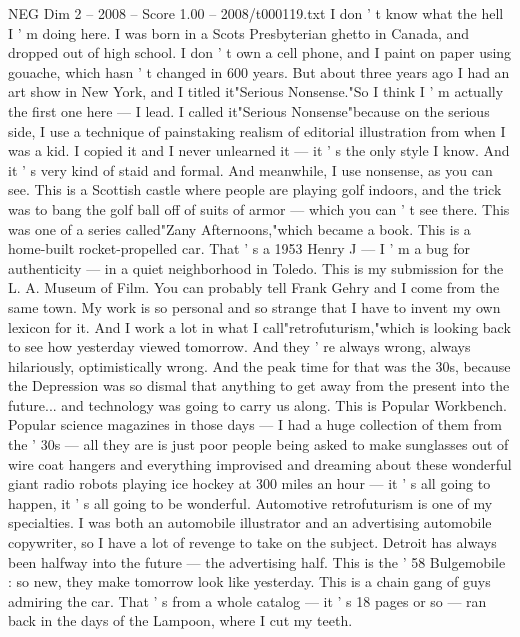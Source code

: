 \begin{textsample}{NEG Dim 2 – 2008 – Score 1.00 – 2008/t000119.txt}  \label{ex:f2_neg_024}
I don ' t know what the hell I ' m doing here.
I was born in a Scots Presbyterian ghetto in Canada, and dropped out of high school.
I don ' t own a cell phone, and I paint on paper using gouache, which hasn ' t changed in 600 years.
But about three years ago I had an art show in New York, and I titled it"Serious Nonsense."So I think I ' m actually the first one here — I lead.
I called it"Serious Nonsense"because on the serious side, I use a technique of painstaking realism of editorial illustration from when I was a kid.
I copied it and I never unlearned it — it ' s the only style I know.
And it ' s very kind of staid and formal.
And meanwhile, I use nonsense, as you can see.
This is a Scottish castle where people are playing golf indoors, and the trick was to bang the golf ball off of suits of armor — which you can ' t see there.
This was one of a series called"Zany Afternoons,"which became a book.
This is a home-built rocket-propelled car.
That ' s a 1953 Henry J — I ' m a bug for authenticity — in a quiet neighborhood in Toledo.
This is my submission for the L.
A.
Museum of Film.
You can probably tell Frank Gehry and I come from the same town.
My work is so personal and so strange that I have to invent my own lexicon for it.
And I work a lot in what I call"retrofuturism,"which is looking back to see how yesterday viewed tomorrow.
And they ' re always wrong, always hilariously, optimistically wrong.
And the peak time for that was the 30s, because the Depression was so dismal that anything to get away from the present into the future... and technology was going to carry us along.
This is Popular Workbench.
Popular science magazines in those days — I had a huge collection of them from the ' 30s — all they are is just poor people being asked to make sunglasses out of wire coat hangers and everything improvised and dreaming about these wonderful giant radio robots playing ice hockey at 300 miles an hour — it ' s all going to happen, it ' s all going to be wonderful.
Automotive retrofuturism is one of my specialties.
I was both an automobile illustrator and an advertising automobile copywriter, so I have a lot of revenge to take on the subject.
Detroit has always been halfway into the future — the advertising half.
This is the ' 58 Bulgemobile : so new, they make tomorrow look like yesterday.
This is a chain gang of guys admiring the car.
That ' s from a whole catalog — it ' s 18 pages or so — ran back in the days of the Lampoon, where I cut my teeth.

\end{textsample}
